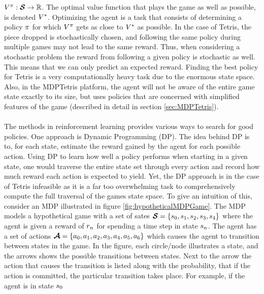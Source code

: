 $V^{\pi} : \boldsymbol{\mathcal{S}} \rightarrow \mathbb{R}$. 
The optimal value function that plays the game as well
as possible, is denoted $V^{*}$. Optimizing the 
agent is a task that consists of determining a policy $\pi$ for which
$V^{\pi}$ gets as close to $V^{*}$
as possible. In the case of Tetris, the piece dropped is stochastically 
chosen, and following the same policy during multiple games may not lead to the 
same reward. Thus, when considering a stochastic problem the reward 
from following a given policy is stochastic as well. This means that 
we can only predict an expected  reward.
Finding the best policy for Tetris is a very computationally heavy 
task due to the enormous state space. Also, in the MDPTetris platform,
the agent will not be aware of the entire game state exactly to its 
size, but uses policies that are concerned with simplified
features of the game (described in detail in section \ref{sec:MDPTetris}).\\
\\
The methods in reinforcement learning provides various ways to
search for good policies.
One approach is 
Dynamic Programming (DP). The idea behind DP is to, for each state,
estimate the reward gained by the agent for each possible action.
Using DP to learn how well a policy performs when starting in a 
given state, one would traverse the entire state set through every
action and record how much reward each action is expected to 
yield.
Yet, the DP approach is in the case of Tetris infeasible as it 
is a far too overwhelming task to comprehensively compute
the full traversal of the games state space. 
To give an intuition of this, consider
an MDP illustrated in figure \ref{fig:hypotheticalMDPGame}.
The MDP models a hypothetical game with a set of sates 
$\boldsymbol{\mathcal{S}} = \{s_0, s_1, s_2, s_3,
s_4\}$ where the agent is given a reward of $r_n$
for spending a time step in state $s_n$. The agent has a 
set of actions $\boldsymbol{\mathcal{A}} = \{a_0, a_1, 
a_2, a_3, a_4, 
a_5, a_6\}$ which causes the agent to transition 
between states in the game. In the figure, each circle/node illustrates a 
state, and the arrows shows the possible transitions between states.
Next to the arrow the action that causes the transition is listed 
along with the probability, that if the action is committed, the particular 
transition takes place. For example, if the agent is in state $s_0$
